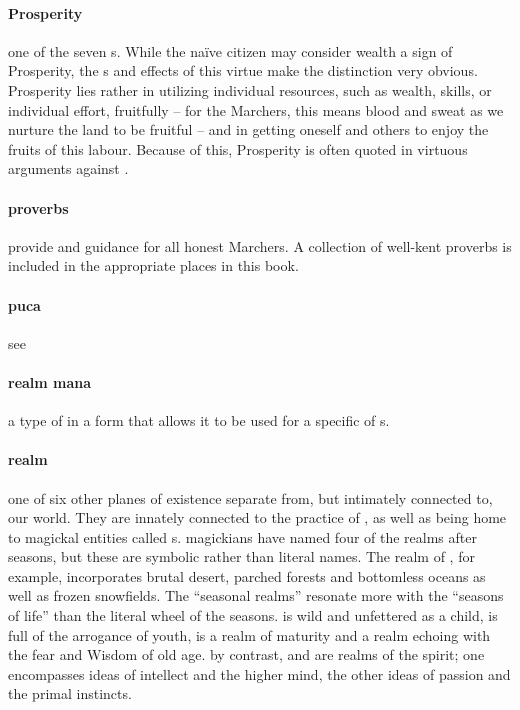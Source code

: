 \paragraph{Prosperity} one of the seven s. While the naïve citizen may consider wealth a sign of Prosperity, the s and effects of this virtue make the distinction very obvious. Prosperity lies rather in utilizing individual resources, such as wealth, skills, or individual effort, fruitfully – for the Marchers, this means blood and sweat as we nurture the land to be fruitful – and in getting oneself and others to enjoy the fruits of this labour. Because of this, Prosperity is often quoted in virtuous arguments against .
\paragraph{proverbs} provide  and guidance for all honest Marchers. A collection of well-kent proverbs is included in the appropriate places in this book.          
\paragraph{puca} see 
\paragraph{realm mana} a type of  in a form that allows it to be used for a specific  of s.
\paragraph{realm} one of six other planes of existence separate from, but intimately connected to, our world. They are innately connected to the practice of , as well as being home to magickal entities called s. magickians have named four of the realms after seasons, but these are symbolic rather than literal names. The realm of , for example, incorporates brutal desert, parched forests and bottomless oceans as well as frozen snowfields. The “seasonal realms” resonate more with the “seasons of life” than the literal wheel of the seasons.  is wild and unfettered as a child,  is full of the arrogance of youth,  is a realm of maturity and  a realm echoing with the fear and Wisdom of old age. by contrast,  and  are realms of the spirit; one encompasses ideas of intellect and the higher mind, the other ideas of passion and the primal instincts.
